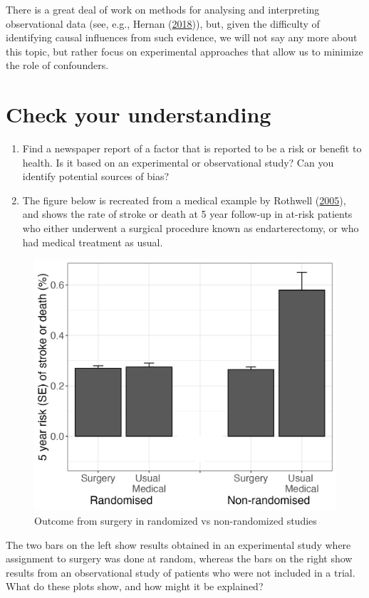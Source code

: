 \documentclass{krantz}
\begin{document}
There is a great deal of work on methods for analysing and interpreting observational data (see, e.g., Hernan (\protect\hyperlink{ref-hernan2018}{2018})), but, given the difficulty of identifying causal influences from such evidence, we will not say any more about this topic, but rather focus on experimental approaches that allow us to minimize the role of confounders.

\hypertarget{check-your-understanding-1}{%
\section{Check your understanding}\label{check-your-understanding-1}}

\begin{enumerate}
\def\labelenumi{\arabic{enumi}.}
\item
  Find a newspaper report of a factor that is reported to be a risk or benefit to health. Is it based on an experimental or observational study? Can you identify potential sources of bias?
\item
  The figure below is recreated from a medical example by Rothwell (\protect\hyperlink{ref-rothwell2005}{2005}), and shows the rate of stroke or death at 5 year follow-up in at-risk patients who either underwent a surgical procedure known as endarterectomy, or who had medical treatment as usual.
\end{enumerate}

\begin{figure}

{\centering \includegraphics[width=0.5\linewidth,height=0.5\textheight]{images_bw/rothwellplot} 

}

\caption{Outcome from surgery in randomized vs non-randomized studies}\label{fig:rothwellfig}
\end{figure}

The two bars on the left show results obtained in an experimental study where assignment to surgery was done at random, whereas the bars on the right show results from an observational study of patients who were not included in a trial. What do these plots show, and how might it be explained?
\end{document}
